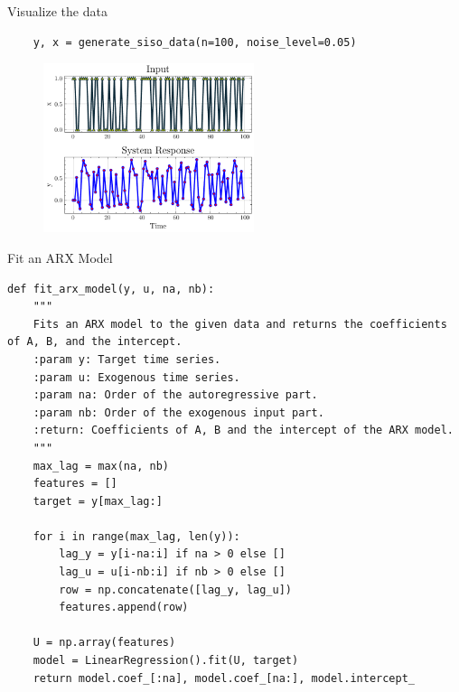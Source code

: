 \documentclass[aspectratio=169,hyperref={pdfpagelabels=false}]{beamer}
\begin{document}
\begin{frame}[fragile]{Visualize the data}
  \begin{verbatim}
    y, x = generate_siso_data(n=100, noise_level=0.05)
  \end{verbatim}
  \begin{figure}
    \centering
    \includegraphics[width=0.55\textwidth]{img/response.pdf}
    \label{fig:your-plot}
  \end{figure}
\end{frame}

\begin{frame}[fragile]{\small{Fit an ARX Model}}
  \begin{verbatim}
def fit_arx_model(y, u, na, nb):
    """
    Fits an ARX model to the given data and returns the coefficients of A, B, and the intercept.
    :param y: Target time series.
    :param u: Exogenous time series.
    :param na: Order of the autoregressive part.
    :param nb: Order of the exogenous input part.
    :return: Coefficients of A, B and the intercept of the ARX model.
    """
    max_lag = max(na, nb)
    features = []
    target = y[max_lag:]

    for i in range(max_lag, len(y)):
        lag_y = y[i-na:i] if na > 0 else []
        lag_u = u[i-nb:i] if nb > 0 else []
        row = np.concatenate([lag_y, lag_u])
        features.append(row)

    U = np.array(features)
    model = LinearRegression().fit(U, target)
    return model.coef_[:na], model.coef_[na:], model.intercept_
  \end{verbatim}
\end{frame}
\end{document}
